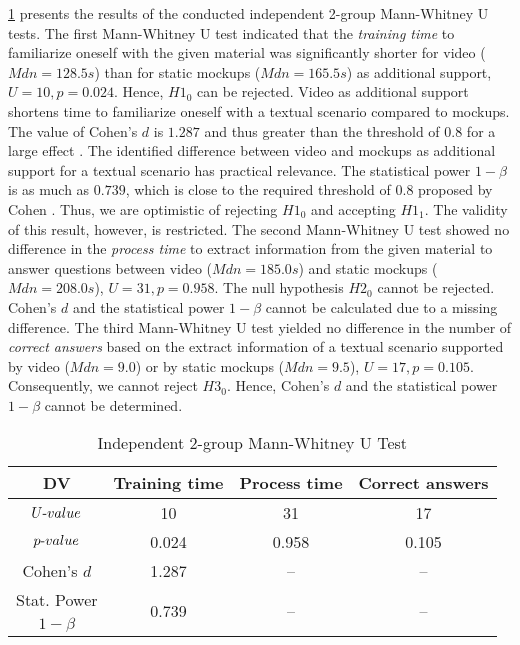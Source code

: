 \documentclass[conference]{IEEEtran}
\begin{document}
\tablename{ \ref{analysis_results}} presents the results of the conducted 
independent 2-group Mann-Whitney U tests.
The first Mann-Whitney U test indicated that the \textit{training time} to 
familiarize oneself with the given material was significantly shorter for video 
($Mdn = 128.5 s$) than for static mockups ($Mdn = 165.5 s$) as additional 
support, $U = 10, p = 0.024$. Hence, $H1_{0}$ can be rejected. Video as 
additional support shortens time to familiarize oneself with a textual scenario 
compared to mockups. The value of Cohen's $d$ is $1.287$ and thus greater than 
the threshold of $0.8$ for a large effect \cite{Cohen.1992}. The identified 
difference between video and mockups as additional support for a textual 
scenario has practical relevance. The statistical power $1 - \beta$ is as 
much as $0.739$, which is close to the required threshold of $0.8$ proposed by 
Cohen \cite{Cohen.2009}. Thus, we are optimistic of rejecting $H1_{0}$ and 
accepting $H1_{1}$. The validity of this result, however, is restricted.
The second Mann-Whitney U test showed no difference in the \textit{process 
time} to extract information from the given material to answer questions 
between video ($Mdn = 185.0 s$) and static mockups ($Mdn = 208.0 s$), 
$U = 31, p = 0.958$. The null hypothesis $H2_{0}$ cannot be rejected. Cohen's 
$d$ and the statistical power $1 - \beta$ cannot be calculated due to 
a missing difference.
The third Mann-Whitney U test yielded no difference in the number of 
\textit{correct answers} based on the extract information of a textual scenario 
supported by video ($Mdn = 9.0$) or by static mockups ($Mdn = 9.5$), $U = 17, p 
= 0.105$. Consequently, we cannot reject $H3_{0}$. Hence, Cohen's $d$ and the 
statistical power $1 - \beta$ cannot be determined.

\begin{table}[htbp]
	\centering
	\caption{Independent 2-group Mann-Whitney U Test}
	\label{analysis_results}
	\begin{tabular}{|c||c||c||c|}
		\hline
		\textbf{DV} & \textbf{Training time} & \textbf{Process time} & 
		\textbf{Correct answers} \\ \hline 
		\hline
		$U\textnormal{-}value$ & 10 & 31 & 17 \\ \hline
		$p\textnormal{-}value$ & 0.024 & 0.958 & 0.105 \\ \hline
		Cohen's $d$ & 1.287 & -- & -- \\ \hline
		Stat. Power & \multirow{2}{*}{0.739} & \multirow{2}{*}{--} & 
		\multirow{2}{*}{--} \\
		$1 - \beta$ &  &  &  \\ \hline
	\end{tabular}
\end{table}
\end{document}
